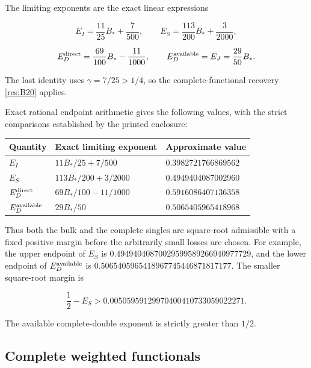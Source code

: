 \documentclass[11pt]{article}
\numberwithin{equation}{section}
\begin{document}
The limiting exponents are the exact linear expressions

\begin{equation}\label{res:D1}
E_I=\frac{11}{25}B_*+\frac7{500},
 \qquad
 E_S=\frac{113}{200}B_*+\frac3{2000},
\end{equation}

\begin{equation}\label{res:D2}
E_D^{\rm direct}=\frac{69}{100}B_*-\frac{11}{1000},
 \qquad
 E_D^{\rm available}=E_J=\frac{29}{50}B_*.
\end{equation}

The last identity uses \(\gamma=7/25>1/4\), so the complete-functional
recovery \eqref{res:B20} applies.

Exact rational endpoint arithmetic gives the following values, with the
strict comparisons established by the printed enclosure:

\begin{center}
\begin{tabular}{lll}
Quantity & Exact limiting exponent & Approximate value\\ \hline
\(E_I\) & \(11B_*/25+7/500\) & \(0.3982721766869562\)\\
\(E_S\) & \(113B_*/200+3/2000\) & \(0.4949404087002960\)\\
\(E_D^{\rm direct}\) & \(69B_*/100-11/1000\) & \(0.5916086407136358\)\\
\(E_D^{\rm available}\) & \(29B_*/50\) & \(0.5065405965418968\)
\end{tabular}
\end{center}

Thus both the bulk and the complete singles are square-root admissible
with a fixed positive margin before the arbitrarily small losses are
chosen. For example, the upper endpoint of \(E_S\) is
\(0.49494040870029599589266940977729\), and the lower endpoint of
\(E_D^{\rm available}\) is \(0.5065405965418967745446871817177\). The
smaller square-root margin is

\begin{equation}\label{res:D3}
\frac12-E_S>
 0.00505959129970400410733059022271.
\end{equation}

The available complete-double exponent is strictly greater than \(1/2\).

\subsection{Complete weighted
functionals}\label{complete-weighted-functionals}
\end{document}

